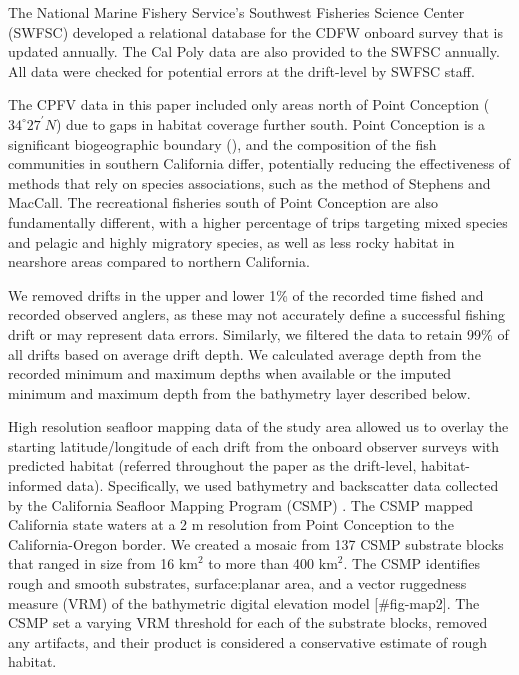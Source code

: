 \documentclass[
  12pt,
  authoryear,
  preprint,
  3p]{elsarticle}
\begin{document}
The National Marine Fishery Service's Southwest Fisheries Science Center
(SWFSC) developed a relational database for the CDFW onboard survey
\citeyearpar{Monk:2014:DRD} that is updated annually. The Cal Poly data
are also provided to the SWFSC annually. All data were checked for
potential errors at the drift-level by SWFSC staff.

The CPFV data in this paper included only areas north of Point
Conception (\(34^\circ 27^\prime N\)) due to gaps in habitat coverage
further south. Point Conception is a significant biogeographic boundary
(\citet{Valentine:1966:NAM}), and the composition of the fish
communities in southern California differ, potentially reducing the
effectiveness of methods that rely on species associations, such as the
method of Stephens and MacCall. The recreational fisheries south of
Point Conception are also fundamentally different, with a higher
percentage of trips targeting mixed species and pelagic and highly
migratory species, as well as less rocky habitat in nearshore areas
compared to northern California.

We removed drifts in the upper and lower 1\% of the recorded time fished
and recorded observed anglers, as these may not accurately define a
successful fishing drift or may represent data errors. Similarly, we
filtered the data to retain 99\% of all drifts based on average drift
depth. We calculated average depth from the recorded minimum and maximum
depths when available or the imputed minimum and maximum depth from the
bathymetry layer described below.

High resolution seafloor mapping data of the study area allowed us to
overlay the starting latitude/longitude of each drift from the onboard
observer surveys with predicted habitat (referred throughout the paper
as the drift-level, habitat-informed data). Specifically, we used
bathymetry and backscatter data collected by the California Seafloor
Mapping Program (CSMP) \citep{Golden:2013:CSW, CSUMB:2014:CSM}. The CSMP
mapped California state waters at a 2 m resolution from Point Conception
to the California-Oregon border. We created a mosaic from 137 CSMP
substrate blocks that ranged in size from 16 \(\mathrm{km}^2\) to more
than 400 \(\mathrm{km}^2\). The CSMP identifies rough and smooth
substrates, surface:planar area, and a vector ruggedness measure (VRM)
of the bathymetric digital elevation model {[}\#fig-map2{]}. The CSMP
set a varying VRM threshold for each of the substrate blocks, removed
any artifacts, and their product is considered a conservative estimate
of rough habitat.
\end{document}
